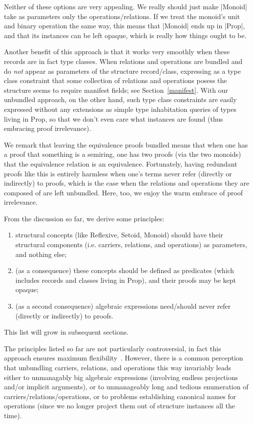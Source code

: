 \documentclass[a4paper,10pt, runningheads]{llncs}
\begin{document}
Neither of these options are very appealing. We really should just make |Monoid| take as parameters
only the operations/relations. If we treat the monoid's unit and binary operation the same way, this
means that |Monoid| ends up in |Prop|, and that its instances can be left opaque, which is really
how things ought to be.

Another benefit of this approach is that it works very smoothly when these records are in fact type
classes. When relations and operations are bundled and do \emph{not} appear as parameters of the
structure record/class, expressing as a type class constraint that some collection of relations and
operations posess the structure seems to require manifest fields; see Section~\ref{manifest}. With
our unbundled approach, on the other hand, such type class constraints are easily expressed without
any extensions as simple type inhabitation queries
of types living in Prop, so that we don't even care what instances are found (thus embracing proof
irrelevance).

We remark that leaving the equivalence proofs bundled means that when one has a proof that something
is a semiring, one has two proofs (via the two monoids) that the equivalence relation is an
equivalence. Fortunately, having redundant proofs like this is entirely harmless when one's terms
never refer (directly or indirectly) to proofs, which is the case when the relations and operations
they are composed of are left unbundled. Here, too, we enjoy the warm embrace of proof irrelevance.

From the discussion so far, we derive some principles:
\begin{enumerate}
 \item structural concepts (like Reflexive, Setoid, Monoid) should have their structural components
(i.e. carriers, relations, and operations) as parameters, and nothing else;
 \item (as a consequence) these concepts should be defined as predicates (which includes records and
classes living in Prop), and their proofs may be kept opaque;
 \item (as a second consequence) algebraic expressions need/should never refer (directly or
indirectly) to proofs.
\end{enumerate}

This list will grow in subsequent sections.

The principles listed so far are not particularly controversial, in fact this
approach ensures maximum flexibility~\cite{Hints}. However,
there is a common perception that unbundling carriers, relations, and operations this way invariably
leads either to unmanagably big algebraic expressions (involving endless projections and/or implicit
arguments), or to unmanageably long and tedious enumeration of carriers/relations/operations, or to
problems establishing canonical names for operations (since we no longer project them out of
structure instances all the time).
\end{document}
